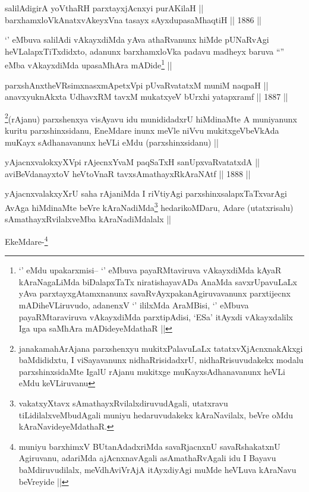 
\begin{shl}
salilAdigirA yoV\s thaRH parxtayxjAcnxyi purA\s KilaH || \\
barxhamxloVkAnatxvAkeyxVna tasayx sAyxdupasaMhaqtiH ||  1886 ||  
\end{shl}

\begin{artha}
`\stext' eMbuva salilAdi vAkayxdiMda yAva athaRvanunx hiMde pUNaRvAgi
  heVLalapxTiTxdidxto, adanunx barxhamxloVka padavu madheyx baruva
  ``\stext'' eMba vAkayxdiMda upasaMhAra mADide\footnote[1]{`\stext'
    eMdu upakarxmisi-- `\stext' eMbuva payaRMtaviruva vAkayxdiMda
    kAyaR kAraNagaLiMda biDalapxTaTx niratishayavADa AnaMda
    savxrUpavuLaLx yAva parxtayxgAtamxnanunx
    savaRvAyxpakanAgiruvavanunx parxtijecnx mADiheVLiruvudo, adanenxV
    `\stext' ililxMda AraMBisi, `\stext' eMbuva payaRMtaraviruva
    vAkayxdiMda parxtipAdisi, `ESa' itAyxdi vAkayxdalilx Iga upa
    saMhAra mADideyeMdathaR ||} ||
\end{artha}


\begin{shl}
parxshAnxtheVR\s simxnasxmApetxV\s pi pUvaRvatatxM muniM naqpaH || \\
anavxyuknAkxta UdhavxRM tavxM mukatxyeV bUrxhi yatapxramf ||  1887 ||  
\end{shl}

\begin{artha}
\footnote[2]{janakamahArAjana parxshenxyu mukitxPalavuLaLx
  tatatxvXjAcnxnakAkxgi baMdididxtu, I viSayavanunx nidhaRrisidadxrU,
  nidhaRrisuvudakekx modalu parxshinxsidaMte IgalU rAjanu mukitxge
  muKayxsAdhanavanunx heVLi eMdu keVLiruvanu}(rAjanu) parxshenxya visAyavu idu munididadxrU hiMdinaMte
A muniyanunx kuritu parxshinxsidanu, EneMdare inunx meVle niVvu
mukitxgeVbeVkAda muKayx sAdhanavanunx heVLi eMdu (parxshinxsidanu) ||
\end{artha}

\begin{shl}
yAjacnxvalokxyXV\s pi rAjecnxYvaM paqSaTxH sanUpxvaRvatatxdA || \\
aviBeVdanayxtoV heVtoVnaR tavxsAmathayxRkAraNAtf ||  1888 ||  
\end{shl}

\begin{artha}
yAjacnxvalakxyXrU saha rAjaniMda I riVtiyAgi parxshinxsalapxTaTxvarAgi
AvAga hiMdinaMte beVre kAraNadiMda\footnote[3]{vakatxyXtavx
  sAmathayxRvilalxdiruvudAgali, utatxravu tiLidilalxveMbudAgali muniyu
hedaruvudakekx kAraNavilalx, beVre oMdu kAraNavideyeMdathaR.} hedarikoMDaru, Adare
(utatxrisalu) sAmathayxRvilalxveMba kAraNadiMdalalx ||

EkeMdare-\footnote[4]{muniyu barxhimxV BUtanAdadxriMda savaRjacnxnU
  savaRshakatxnU Agiruvanu, adariMda ajAcnxnavAgali asAmathaRvAgali
  idu I Bayavu baMdiruvudilalx, meVdhAviVrAjA itAyxdiyAgi muMde
  heVLuva kAraNavu beVreyide ||}
\end{artha}

